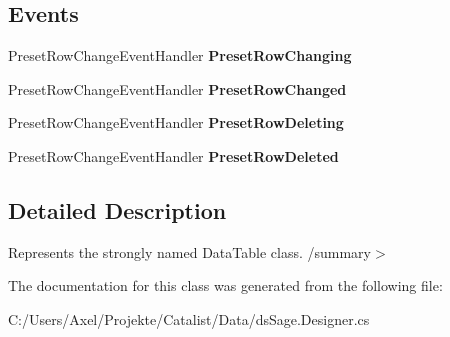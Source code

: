 \subsection*{Events}
\begin{DoxyCompactItemize}
\item 
Preset\+Row\+Change\+Event\+Handler {\bfseries Preset\+Row\+Changing}\hypertarget{class_products_1_1_data_1_1ds_sage_1_1_preset_data_table_a129a8ff87badf575d8e9b10fc27be204}{}\label{class_products_1_1_data_1_1ds_sage_1_1_preset_data_table_a129a8ff87badf575d8e9b10fc27be204}

\item 
Preset\+Row\+Change\+Event\+Handler {\bfseries Preset\+Row\+Changed}\hypertarget{class_products_1_1_data_1_1ds_sage_1_1_preset_data_table_ae0ab66cabdde516557edb48bcb8e133c}{}\label{class_products_1_1_data_1_1ds_sage_1_1_preset_data_table_ae0ab66cabdde516557edb48bcb8e133c}

\item 
Preset\+Row\+Change\+Event\+Handler {\bfseries Preset\+Row\+Deleting}\hypertarget{class_products_1_1_data_1_1ds_sage_1_1_preset_data_table_a5d7f2d7082df835fd91dd926daf9eaf2}{}\label{class_products_1_1_data_1_1ds_sage_1_1_preset_data_table_a5d7f2d7082df835fd91dd926daf9eaf2}

\item 
Preset\+Row\+Change\+Event\+Handler {\bfseries Preset\+Row\+Deleted}\hypertarget{class_products_1_1_data_1_1ds_sage_1_1_preset_data_table_a159892f26705513b92f7b281489d1da3}{}\label{class_products_1_1_data_1_1ds_sage_1_1_preset_data_table_a159892f26705513b92f7b281489d1da3}

\end{DoxyCompactItemize}


\subsection{Detailed Description}
Represents the strongly named Data\+Table class. /summary$>$ 

The documentation for this class was generated from the following file\+:\begin{DoxyCompactItemize}
\item 
C\+:/\+Users/\+Axel/\+Projekte/\+Catalist/\+Data/ds\+Sage.\+Designer.\+cs\end{DoxyCompactItemize}
